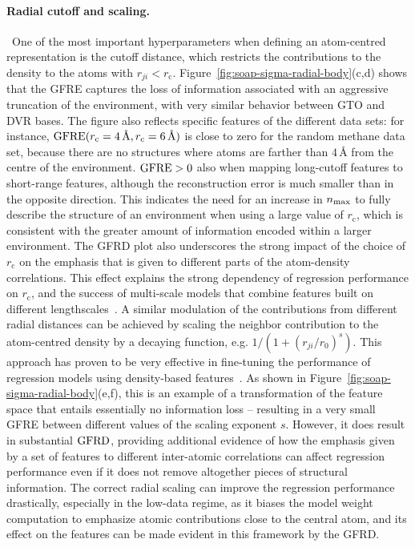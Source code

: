 \paragraph*{Radial cutoff and scaling.}\,
One of the most important hyperparameters when defining an atom-centred representation is the cutoff distance, which restricts the contributions to the density to the atoms with $r_{ji}<r_{\text{c}}$.
Figure~\ref{fig:soap-sigma-radial-body}(c,d) shows that the GFRE captures the loss of information associated with an aggressive truncation of the environment, with very similar behavior between GTO and DVR bases. 
The figure also reflects specific features of the different data sets: for instance, $\operatorname{GFRE}(r_\text{c}=4\,\text{\AA},r_\text{c}=6\,\text{\AA})$ is close to zero for the random methane data set, because there are no structures where atoms are farther than $4\,$\AA{} from the centre of the environment. $\operatorname{GFRE}>0$ also when mapping long-cutoff features to short-range features, although the reconstruction error is much smaller than in the opposite direction. 
This indicates the need for an increase in $n_\mathrm{max}$ to fully describe the structure of an environment when using a large value of $r_\text{c}$, which is consistent with the greater amount of information encoded within a larger environment.
The GFRD plot also underscores the strong impact of the choice of $r_\text{c}$ on the emphasis that is given to different parts of the atom-density correlations. 
This effect explains the strong dependency of regression performance on $r_\text{c}$, and the success of multi-scale models that combine features built on different lengthscales~\cite{bart+17sa}. 
A similar modulation of the contributions from different radial distances can be achieved by scaling the neighbor contribution to the atom-centred density by a decaying function, e.g. $1/(1+(r_{ji}/r_0)^s)$. This approach has proven to be very effective in fine-tuning the performance of regression models using density-based features~\cite{fabe+17jctc,will+18pccp,paru+18ncomm}.
As shown in Figure~\ref{fig:soap-sigma-radial-body}(e,f), this is an example of a transformation of the feature space that entails essentially no information loss -- resulting in a very small GFRE between different values of the scaling exponent $s$. However, it does result in substantial $\operatorname{GFRD}$, providing additional evidence of how the emphasis given by a set of features to different inter-atomic correlations can affect regression performance even if it does not remove altogether pieces of structural information.
The correct radial scaling can improve the regression performance drastically, especially in the low-data regime, as it biases the model weight computation to emphasize atomic contributions close to the central atom, and its effect on the features can be made evident in this framework by the GFRD.


